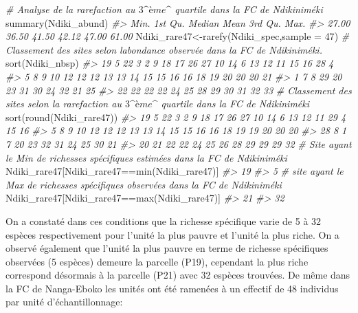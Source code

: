 \documentclass[
  12pt,
  a4paper,
  extrafontsizes,
  onecolumn,
  openright]{book}
\newenvironment{Shaded}{\begin{snugshade}}{\end{snugshade}}
\newcommand{\AttributeTok}[1]{\textcolor[rgb]{0.77,0.63,0.00}{#1}}
\newcommand{\CommentTok}[1]{\textcolor[rgb]{0.56,0.35,0.01}{\textit{#1}}}
\newcommand{\DecValTok}[1]{\textcolor[rgb]{0.00,0.00,0.81}{#1}}
\newcommand{\FunctionTok}[1]{\textcolor[rgb]{0.00,0.00,0.00}{#1}}
\newcommand{\NormalTok}[1]{#1}
\newcommand{\OtherTok}[1]{\textcolor[rgb]{0.56,0.35,0.01}{#1}}
\newcommand{\SpecialCharTok}[1]{\textcolor[rgb]{0.00,0.00,0.00}{#1}}
\theoremstyle{definition}
\theoremstyle{definition}
\theoremstyle{definition}
\theoremstyle{definition}
\theoremstyle{remark}
\begin{document}
\begin{Shaded}
\begin{Highlighting}[]
\CommentTok{\# Analyse de la rarefaction au $3\^{}ème\^{}$ quartile dans la FC de Ndikiniméki}
\FunctionTok{summary}\NormalTok{(Ndiki\_abund)}
\CommentTok{\#\textgreater{}    Min. 1st Qu.  Median    Mean 3rd Qu.    Max. }
\CommentTok{\#\textgreater{}   27.00   36.50   41.50   42.12   47.00   61.00}
\NormalTok{Ndiki\_rare47}\OtherTok{\textless{}{-}}\FunctionTok{rarefy}\NormalTok{(Ndiki\_spec,}\AttributeTok{sample =} \DecValTok{47}\NormalTok{)}
\CommentTok{\# Classement des sites selon l\textquotesingle{}abondance observée dans la FC de Ndikiniméki.}
\FunctionTok{sort}\NormalTok{(Ndiki\_nbsp)}
\CommentTok{\#\textgreater{} 19  5 22  3  2  9 18 17 26 27 10 14  6 13 12 11 15 16 28  4 }
\CommentTok{\#\textgreater{}  5  8  9 10 12 12 12 13 13 14 15 15 16 16 18 19 20 20 20 21 }
\CommentTok{\#\textgreater{}  1  7  8 29 20 23 31 30 24 32 21 25 }
\CommentTok{\#\textgreater{} 22 22 22 22 24 25 28 29 30 31 32 33}
\CommentTok{\# Classement des sites selon la rarefaction au $3\^{}ème\^{}$ quartile dans la FC de Ndikiniméki}
\FunctionTok{sort}\NormalTok{(}\FunctionTok{round}\NormalTok{(Ndiki\_rare47))}
\CommentTok{\#\textgreater{} 19  5 22  3  2  9 18 17 26 27 10 14  6 13 12 11 29  4 15 16 }
\CommentTok{\#\textgreater{}  5  8  9 10 12 12 12 13 13 14 15 15 16 16 18 19 19 20 20 20 }
\CommentTok{\#\textgreater{} 28  8  1  7 20 23 32 31 24 25 30 21 }
\CommentTok{\#\textgreater{} 20 21 22 22 24 25 26 28 29 29 29 32}
\CommentTok{\# Site ayant le Min de richesses spécifiques estimées dans la FC de Ndikiniméki}
\NormalTok{Ndiki\_rare47[Ndiki\_rare47}\SpecialCharTok{==}\FunctionTok{min}\NormalTok{(Ndiki\_rare47)]}
\CommentTok{\#\textgreater{} 19 }
\CommentTok{\#\textgreater{}  5}
\CommentTok{\# site ayant le Max de richesses spécifiques observées dans la FC de Ndikiniméki}
\NormalTok{Ndiki\_rare47[Ndiki\_rare47}\SpecialCharTok{==}\FunctionTok{max}\NormalTok{(Ndiki\_rare47)]}
\CommentTok{\#\textgreater{} 21 }
\CommentTok{\#\textgreater{} 32}
\end{Highlighting}
\end{Shaded}

On a constaté dans ces conditions que la richesse spécifique varie de 5 à 32 espèces respectivement pour l'unité la plus pauvre et l'unité la plus riche. On a observé également que l'unité la plus pauvre en terme de richesse spécifiques observées (5 espèces) demeure la parcelle (P19), cependant la plus riche correspond désormais à la parcelle (P21) avec 32 espèces trouvées. De même dans la FC de Nanga-Eboko les unités ont été ramenées à un effectif de 48 individus par unité d'échantillonnage:
\end{document}
